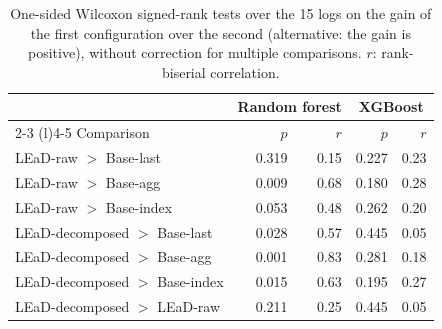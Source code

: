 \begin{table}[!htbp]
\centering
\caption{One-sided Wilcoxon signed-rank tests over the 15 logs on the gain of the first configuration over the second (alternative: the gain is positive), without correction for multiple comparisons. $r$: rank-biserial correlation.}
\label{tab:wilcoxon}
\scriptsize
\setlength{\tabcolsep}{4pt}
\begin{tabular}{@{}lrrrr@{}}
\toprule
& \multicolumn{2}{c}{\textbf{Random forest}} & \multicolumn{2}{c}{\textbf{XGBoost}} \\
\cmidrule(lr){2-3} \cmidrule(l){4-5}
Comparison & $p$ & $r$ & $p$ & $r$ \\
\midrule
LEaD-raw $>$ Base-last & 0.319 & 0.15 & 0.227 & 0.23 \\
LEaD-raw $>$ Base-agg & 0.009 & 0.68 & 0.180 & 0.28 \\
LEaD-raw $>$ Base-index & 0.053 & 0.48 & 0.262 & 0.20 \\
\addlinespace[2pt]
LEaD-decomposed $>$ Base-last & 0.028 & 0.57 & 0.445 & 0.05 \\
LEaD-decomposed $>$ Base-agg & 0.001 & 0.83 & 0.281 & 0.18 \\
LEaD-decomposed $>$ Base-index & 0.015 & 0.63 & 0.195 & 0.27 \\
\addlinespace[2pt]
LEaD-decomposed $>$ LEaD-raw & 0.211 & 0.25 & 0.445 & 0.05 \\
\bottomrule
\end{tabular}
\end{table}
